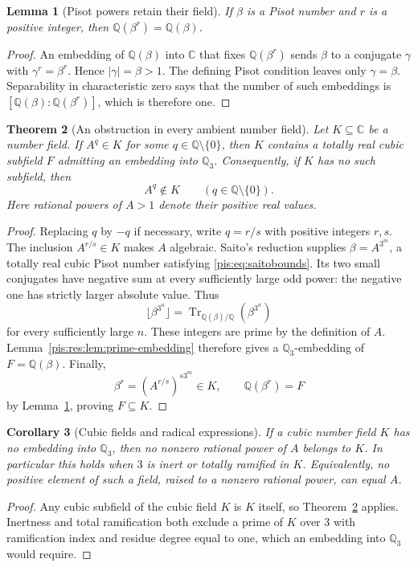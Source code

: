 \documentclass[11pt,a4paper]{article}
\newtheorem{theorem}{Theorem}[section]
\newtheorem{lemma}[theorem]{Lemma}
\newtheorem{corollary}[theorem]{Corollary}
\theoremstyle{definition}\newtheorem{definition}[theorem]{Definition}
\theoremstyle{remark}\newtheorem{remark}[theorem]{Remark}
\newcommand{\Q}{\mathbb Q}\newcommand{\R}{\mathbb R}
\newcommand{\Tr}{\operatorname{Tr}}\newcommand{\Nm}{\operatorname{N}}
\begin{document}
\begin{lemma}[Pisot powers retain their field]
\label{pis:res:lem:power-field}
If $\beta$ is a Pisot number and $r$ is a positive integer, then
$\Q(\beta^r)=\Q(\beta)$.
\end{lemma}
\begin{proof}
An embedding of $\Q(\beta)$ into $\mathbb C$ that fixes
$\Q(\beta^r)$ sends $\beta$ to a conjugate $\gamma$ with
$\gamma^r=\beta^r$. Hence $|\gamma|=\beta>1$. The defining Pisot
condition leaves only $\gamma=\beta$. Separability in characteristic
zero says that the number of such embeddings is
$[\Q(\beta):\Q(\beta^r)]$, which is therefore one.
\end{proof}

\begin{theorem}[An obstruction in every ambient number field]
\label{pis:res:thm:ambient}
Let $K\subseteq\mathbb C$ be a number field. If $A^q\in K$ for some
$q\in\Q\setminus\{0\}$, then $K$ contains a totally real cubic
subfield $F$ admitting an embedding into $\Q_3$. Consequently, if
$K$ has no such subfield, then
\[
 \boxed{A^q\notin K\qquad(q\in\Q\setminus\{0\}).}
\]
Here rational powers of $A>1$ denote their positive real values.
\end{theorem}
\begin{proof}
Replacing $q$ by $-q$ if necessary, write $q=r/s$ with positive
integers $r,s$. The inclusion $A^{r/s}\in K$ makes $A$ algebraic.
Saito's reduction \cite[Theorem~1.7]{SaitoVariants} supplies
$\beta=A^{3^m}$, a totally real cubic Pisot number satisfying
\eqref{pis:eq:saitobounds}. Its two small conjugates have negative sum
at every sufficiently large odd power: the negative one has strictly
larger absolute value. Thus
\[
 \lfloor\beta^{3^n}\rfloor
 =\Tr_{\Q(\beta)/\Q}(\beta^{3^n})
\]
for every sufficiently large $n$. These integers are prime by the
definition of $A$. Lemma~\ref{pis:res:lem:prime-embedding} therefore
gives a $\Q_3$-embedding of $F=\Q(\beta)$. Finally,
\[
 \beta^r=(A^{r/s})^{s3^m}\in K,
 \qquad \Q(\beta^r)=F
\]
by Lemma~\ref{pis:res:lem:power-field}, proving $F\subseteq K$.
\end{proof}

\begin{corollary}[Cubic fields and radical expressions]
\label{pis:res:cor:cubic}
If a cubic number field $K$ has no embedding into $\Q_3$, then no
nonzero rational power of $A$ belongs to $K$. In particular this holds
when $3$ is inert or totally ramified in $K$. Equivalently, no positive
element of such a field, raised to a nonzero rational power, can
equal $A$.
\end{corollary}
\begin{proof}
Any cubic subfield of the cubic field $K$ is $K$ itself, so
Theorem~\ref{pis:res:thm:ambient} applies. Inertness and total ramification
both exclude a prime of $K$ over $3$ with ramification index and
residue degree equal to one, which an embedding into $\Q_3$ would
require.
\end{proof}
\end{document}
